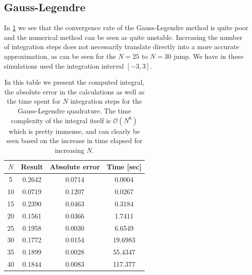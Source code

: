 \documentclass[intlimits]{amsart}
\begin{document}
\subsection{Gauss-Legendre}
In \cref{tab:legendre} we see that the convergence rate of the Gauss-Legendre
method is quite poor and the numerical method can be seen as quite unstable.
Increasing the number of integration steps does not necessarily translate
directly into a more accurate approximation, as can be seen for the $N=25$ to
$N=30$ jump. We have in these simulations used the integration interval $[-3,
3]$.
\begin{table}[p]
  \centering
  \caption{In this table we present the computed integral, the absolute error
    in the calculations as well as the time spent for $N$ integration steps for the Gauss-Legendre
    quadrature. The time complexity of the integral itself is $\mathcal{O}(N^6)$
which is pretty immense, and can clearly be seen based on the increase in time
elapsed for increasing $N$. }
  \label{tab:legendre}
  \begin{tabular}{cccc}
    $N$ & Result & Absolute error & Time [sec]\\
    \hline
    \hline
    5& 0.2642& 0.0714& 0.0004\\
    10& 0.0719& 0.1207& 0.0267\\
    15& 0.2390& 0.0463& 0.3184\\
    20& 0.1561& 0.0366& 1.7411\\
    25& 0.1958& 0.0030& 6.6549\\
    30& 0.1772& 0.0154& 19.6983\\
    35& 0.1899& 0.0028&55.4347\\
    40&0.1844&0.0083&117.377\\
    \hline
  \end{tabular}
\end{table}
\end{document}
